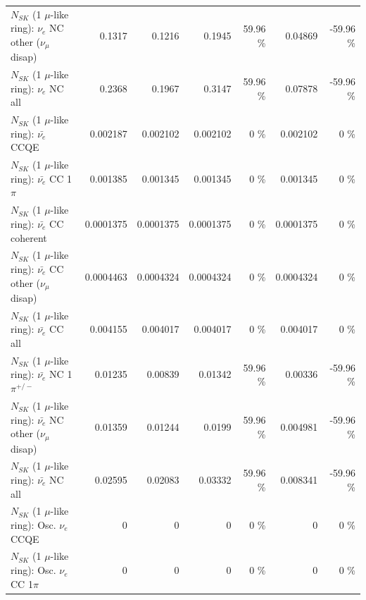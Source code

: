 \begin{table}
\begin{tabular}{| l | r | r | r  r | r  r |}
                $N_{SK}$ (1 $\mu$-like ring): $\nu_e$ NC other ($\nu_\mu$ disap) &          0.1317 &          0.1216 &          0.1945 &    59.96 \%  &         0.04869 &   -59.96 \%  \\ 
                                  $N_{SK}$ (1 $\mu$-like ring): $\nu_{e}$ NC all &          0.2368 &          0.1967 &          0.3147 &    59.96 \%  &         0.07878 &   -59.96 \%  \\ 
\hline
\hline
\hline
                                $N_{SK}$ (1 $\mu$-like ring): $\bar{\nu_e}$ CCQE &        0.002187 &        0.002102 &        0.002102 &        0 \%  &        0.002102 &        0 \%  \\ 
                           $N_{SK}$ (1 $\mu$-like ring): $\bar{\nu_e}$ CC 1$\pi$ &        0.001385 &        0.001345 &        0.001345 &        0 \%  &        0.001345 &        0 \%  \\ 
                         $N_{SK}$ (1 $\mu$-like ring): $\bar{\nu_e}$ CC coherent &       0.0001375 &       0.0001375 &       0.0001375 &        0 \%  &       0.0001375 &        0 \%  \\ 
          $N_{SK}$ (1 $\mu$-like ring): $\bar{\nu_e}$ CC other ($\nu_\mu$ disap) &       0.0004463 &       0.0004324 &       0.0004324 &        0 \%  &       0.0004324 &        0 \%  \\ 
                            $N_{SK}$ (1 $\mu$-like ring): $\bar{\nu_{e}}$ CC all &        0.004155 &        0.004017 &        0.004017 &        0 \%  &        0.004017 &        0 \%  \\ 
\hline
                     $N_{SK}$ (1 $\mu$-like ring): $\bar{\nu_e}$ NC 1$\pi^{+/-}$ &         0.01235 &         0.00839 &         0.01342 &    59.96 \%  &         0.00336 &   -59.96 \%  \\ 
          $N_{SK}$ (1 $\mu$-like ring): $\bar{\nu_e}$ NC other ($\nu_\mu$ disap) &         0.01359 &         0.01244 &          0.0199 &    59.96 \%  &        0.004981 &   -59.96 \%  \\ 
                            $N_{SK}$ (1 $\mu$-like ring): $\bar{\nu_{e}}$ NC all &         0.02595 &         0.02083 &         0.03332 &    59.96 \%  &        0.008341 &   -59.96 \%  \\ 
\hline
\hline
\hline
                                 $N_{SK}$ (1 $\mu$-like ring): Osc. $\nu_e$ CCQE &               0 &               0 &               0 &        0 \%  &               0 &        0 \%  \\ 
                            $N_{SK}$ (1 $\mu$-like ring): Osc. $\nu_e$ CC 1$\pi$ &               0 &               0 &               0 &        0 \%  &               0 &        0 \%  \\ 

\end{tabular}
\end{table}
